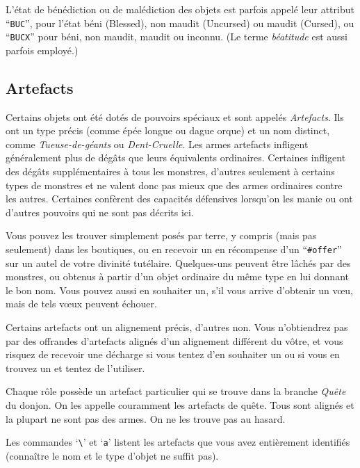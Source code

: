 \documentclass[titlepage]{article}
\begin{document}
L'état de bénédiction ou de malédiction des objets est parfois appelé leur
attribut ``\texttt{BUC}'', pour l'état béni (Blessed), non maudit (Uncursed)
ou maudit (Cursed), ou ``\texttt{BUCX}'' pour béni, non maudit, maudit ou inconnu.
(Le terme \textit{béatitude} est aussi parfois employé.)

\subsection*{Artefacts}

Certains objets ont été dotés de pouvoirs spéciaux et sont appelés
\textit{Artefacts}.
Ils ont un type précis (comme épée longue ou dague orque) et un nom
distinct, comme \textit{Tueuse-de-géants} ou \textit{Dent-Cruelle}.
Les armes artefacts infligent généralement plus de dégâts que leurs équivalents ordinaires.
Certaines infligent des dégâts supplémentaires à tous les monstres, d'autres seulement
à certains types de monstres et ne valent donc pas mieux que des armes ordinaires
contre les autres.
Certaines confèrent des capacités défensives lorsqu'on les manie ou ont d'autres
pouvoirs qui ne sont pas décrits ici.

Vous pouvez les trouver simplement posés par terre, y compris (mais pas
seulement) dans les boutiques, ou en recevoir un en récompense d'un ``\texttt{\#offer}''
sur un autel de votre divinité tutélaire.
Quelques-uns peuvent être lâchés par des monstres, ou obtenus à partir d'un objet
ordinaire du même type en lui donnant le bon nom.
Vous pouvez aussi en souhaiter un, s'il vous arrive d'obtenir un vœu, mais de tels
vœux peuvent échouer.

Certains artefacts ont un alignement précis, d'autres non.
Vous n'obtiendrez pas par des offrandes d'artefacts alignés d'un alignement
différent du vôtre, et vous risquez de recevoir une décharge si vous tentez d'en
souhaiter un ou si vous en trouvez un et tentez de l'utiliser.

Chaque rôle possède un artefact particulier qui se trouve dans la branche
\textit{Quête} du donjon.
On les appelle couramment les artefacts de quête.
Tous sont alignés et la plupart ne sont pas des armes.
On ne les trouve pas au hasard.

Les commandes `\texttt{\textbackslash}' et `\texttt{\textasciigrave{}a}'
listent les artefacts que vous avez entièrement identifiés (connaître le nom et
le type d'objet ne suffit pas).
\end{document}
